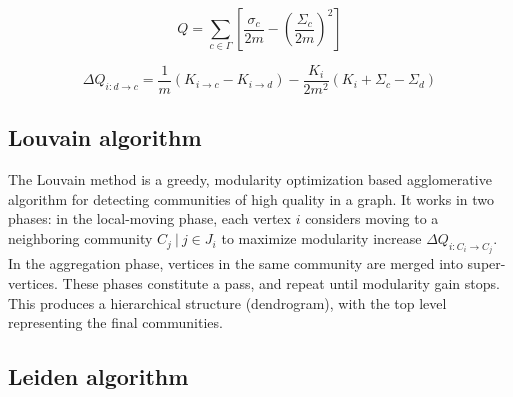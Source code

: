 \begin{equation}
\label{eq:modularity}
  Q
  = \sum_{c \in \Gamma} \left[\frac{\sigma_c}{2m} - \left(\frac{\Sigma_c}{2m}\right)^2\right]
\end{equation}

\begin{equation}
\label{eq:delta-modularity}
  \Delta Q_{i: d \rightarrow c}
  = \frac{1}{m} (K_{i \rightarrow c} - K_{i \rightarrow d}) - \frac{K_i}{2m^2} (K_i + \Sigma_c - \Sigma_d)
\end{equation}




\subsection{Louvain algorithm}
\label{sec:about-Louvain}

The Louvain method is a greedy, modularity optimization based agglomerative algorithm for detecting communities of high quality in a graph. It works in two phases: in the local-moving phase, each vertex $i$ considers moving to a neighboring community $C_j\ |\ j \in J_i$ to maximize modularity increase $\Delta Q_{i:C_i \rightarrow C_j}$. In the aggregation phase, vertices in the same community are merged into super-vertices. These phases constitute a pass, and repeat until modularity gain stops. This produces a hierarchical structure (dendrogram), with the top level representing the final communities.



\subsection{Leiden algorithm}
\label{sec:about-leiden}


